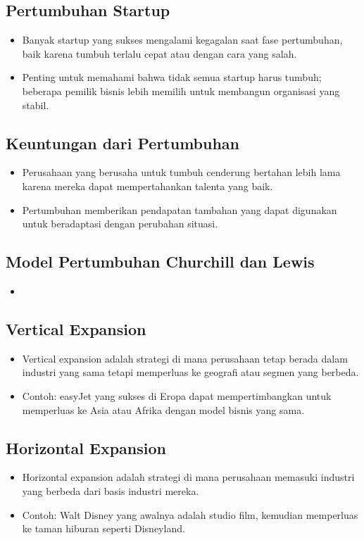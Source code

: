 \documentclass{article}
\begin{document}
\subsection{Pertumbuhan Startup}
\begin{itemize}
    \item Banyak startup yang sukses mengalami kegagalan saat fase pertumbuhan, baik karena tumbuh terlalu cepat atau dengan cara yang salah.
    \item Penting untuk memahami bahwa tidak semua startup harus tumbuh; beberapa pemilik bisnis lebih memilih untuk membangun organisasi yang stabil.
\end{itemize}

\subsection{Keuntungan dari Pertumbuhan}
\begin{itemize}
    \item Perusahaan yang berusaha untuk tumbuh cenderung bertahan lebih lama karena mereka dapat mempertahankan talenta yang baik.
    \item Pertumbuhan memberikan pendapatan tambahan yang dapat digunakan untuk beradaptasi dengan perubahan situasi.
\end{itemize}

\subsection{Model Pertumbuhan Churchill dan Lewis}
\begin{itemize}
    \item
\end{itemize}

\subsection{Vertical Expansion}
\begin{itemize}
    \item Vertical expansion adalah strategi di mana perusahaan tetap berada dalam industri yang sama tetapi memperluas ke geografi atau segmen yang berbeda.
    \item Contoh: easyJet yang sukses di Eropa dapat mempertimbangkan untuk memperluas ke Asia atau Afrika dengan model bisnis yang sama.
\end{itemize}

\subsection{Horizontal Expansion}
\begin{itemize}
    \item Horizontal expansion adalah strategi di mana perusahaan memasuki industri yang berbeda dari basis industri mereka.
    \item Contoh: Walt Disney yang awalnya adalah studio film, kemudian memperluas ke taman hiburan seperti Disneyland.
\end{itemize}
\end{document}
